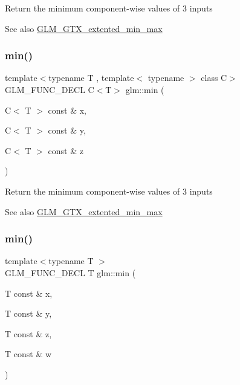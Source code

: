 Return the minimum component-\/wise values of 3 inputs \begin{DoxySeeAlso}{See also}
\hyperlink{group__gtx__extented__min__max}{G\+L\+M\+\_\+\+G\+T\+X\+\_\+extented\+\_\+min\+\_\+max} 
\end{DoxySeeAlso}
\mbox{\label{group__gtx__extented__min__max_ga42b5c3fc027fd3d9a50d2ccc9126d9f0}} 
\subsubsection{\texorpdfstring{min()}{min()}\hspace{0.1cm}{\footnotesize\ttfamily [3/6]}}
{\footnotesize\ttfamily template$<$typename T , template$<$ typename $>$ class C$>$ \\
G\+L\+M\+\_\+\+F\+U\+N\+C\+\_\+\+D\+E\+CL C$<$T$>$ glm\+::min (\begin{DoxyParamCaption}\item[{C$<$ T $>$ const \&}]{x,  }\item[{C$<$ T $>$ const \&}]{y,  }\item[{C$<$ T $>$ const \&}]{z }\end{DoxyParamCaption})}

Return the minimum component-\/wise values of 3 inputs \begin{DoxySeeAlso}{See also}
\hyperlink{group__gtx__extented__min__max}{G\+L\+M\+\_\+\+G\+T\+X\+\_\+extented\+\_\+min\+\_\+max} 
\end{DoxySeeAlso}
\mbox{\label{group__gtx__extented__min__max_ga95466987024d03039607f09e69813d69}} 
\subsubsection{\texorpdfstring{min()}{min()}\hspace{0.1cm}{\footnotesize\ttfamily [4/6]}}
{\footnotesize\ttfamily template$<$typename T $>$ \\
G\+L\+M\+\_\+\+F\+U\+N\+C\+\_\+\+D\+E\+CL T glm\+::min (\begin{DoxyParamCaption}\item[{T const \&}]{x,  }\item[{T const \&}]{y,  }\item[{T const \&}]{z,  }\item[{T const \&}]{w }\end{DoxyParamCaption})}

